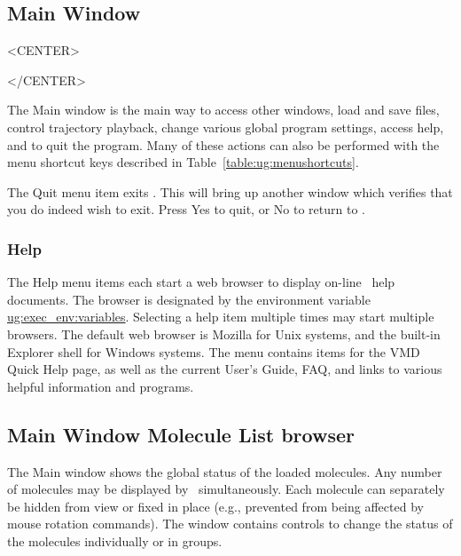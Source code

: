 %
%
%


\subsection{Main Window}
\label{ug:ui:window:main}

\begin{rawhtml}
<CENTER>
\end{rawhtml}
\begin{rawhtml}
</CENTER>
\end{rawhtml}

The {\sf Main} window is the main way to access other windows,
load and save files, control trajectory playback,
change various global program settings, access help, and to quit
the program.  
Many of these actions can also be performed with the menu shortcut keys
described in Table~\ref{table:ug:menushortcuts}.

The {\sf Quit} menu item exits \VMD.  This will bring up
another window which verifies that you do indeed wish to exit.  
Press {\sf Yes} to quit, or {\sf No} to return to \VMD.


\subsubsection{Help}
 \label{ug:ui:disp:help}
 The {\sf Help} menu items each start a web browser to display on-line \VMD\
 help documents.  The browser is designated by the environment variable
 \hyperref{{\tt VMDHTMLVIEWER}}{{\tt VMDHTMLVIEWER} [\S~}{]}
 {ug:exec_env:variables}. Selecting a help item multiple times may start
 multiple browsers.  The default web browser is Mozilla for Unix systems, and
 the built-in Explorer shell for Windows systems.  The menu contains items for the VMD Quick Help
 page, as well as the current User's Guide, FAQ, and links to various helpful
 information and programs.  


\subsection{Main Window Molecule List browser}
\label{ug:ui:window:mol}
\label{ug:ui:window:mol:top}
The {\sf Main} window shows the global status of the loaded molecules.  Any
number of molecules may be displayed by \VMD\ simultaneously.  Each molecule
can separately be hidden from view or fixed in place (e.g., prevented from
being affected by mouse rotation commands).  The window contains controls to
change the status of the molecules individually or in groups.

